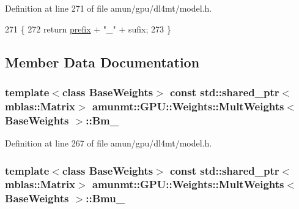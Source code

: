 Definition at line 271 of file amun/gpu/dl4mt/model.\+h.


\begin{DoxyCode}
271                                                   \{
272       \textcolor{keywordflow}{return} \hyperlink{namespacemarian_1_1keywords_aa2cadd13ac94307ff92c68efb57264ac}{prefix} + \textcolor{stringliteral}{"\_"} + sufix;
273     \}
\end{DoxyCode}


\subsection{Member Data Documentation}
\subsubsection[{\texorpdfstring{Bm\+\_\+}{Bm_}}]{\setlength{\rightskip}{0pt plus 5cm}template$<$class Base\+Weights$>$ const std\+::shared\+\_\+ptr$<${\bf mblas\+::\+Matrix}$>$ {\bf amunmt\+::\+G\+P\+U\+::\+Weights\+::\+Mult\+Weights}$<$ Base\+Weights $>$\+::Bm\+\_\+}\hypertarget{structamunmt_1_1GPU_1_1Weights_1_1MultWeights_af0a85a328836ed039c475d90e71decab}{}\label{structamunmt_1_1GPU_1_1Weights_1_1MultWeights_af0a85a328836ed039c475d90e71decab}


Definition at line 267 of file amun/gpu/dl4mt/model.\+h.

\subsubsection[{\texorpdfstring{Bmu\+\_\+}{Bmu_}}]{\setlength{\rightskip}{0pt plus 5cm}template$<$class Base\+Weights$>$ const std\+::shared\+\_\+ptr$<${\bf mblas\+::\+Matrix}$>$ {\bf amunmt\+::\+G\+P\+U\+::\+Weights\+::\+Mult\+Weights}$<$ Base\+Weights $>$\+::Bmu\+\_\+}\hypertarget{structamunmt_1_1GPU_1_1Weights_1_1MultWeights_a923bcc07d5054634f8c7f82040cf743d}{}\label{structamunmt_1_1GPU_1_1Weights_1_1MultWeights_a923bcc07d5054634f8c7f82040cf743d}


